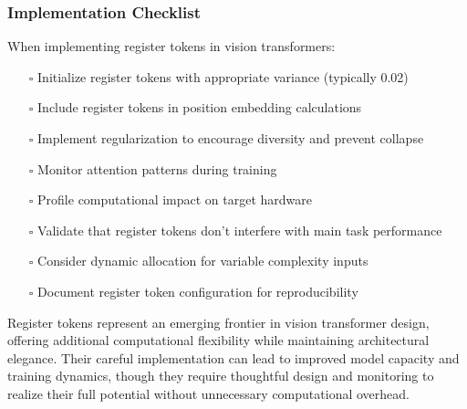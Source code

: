 \subsubsection{Implementation Checklist}

When implementing register tokens in vision transformers:

\begin{itemize}
\item[$\square$] Initialize register tokens with appropriate variance (typically 0.02)
\item[$\square$] Include register tokens in position embedding calculations
\item[$\square$] Implement regularization to encourage diversity and prevent collapse
\item[$\square$] Monitor attention patterns during training
\item[$\square$] Profile computational impact on target hardware
\item[$\square$] Validate that register tokens don't interfere with main task performance
\item[$\square$] Consider dynamic allocation for variable complexity inputs
\item[$\square$] Document register token configuration for reproducibility
\end{itemize}

Register tokens represent an emerging frontier in vision transformer design, offering additional computational flexibility while maintaining architectural elegance. Their careful implementation can lead to improved model capacity and training dynamics, though they require thoughtful design and monitoring to realize their full potential without unnecessary computational overhead.